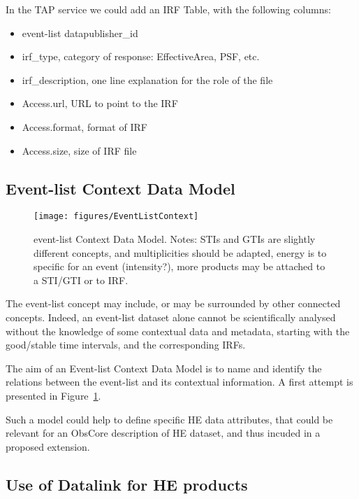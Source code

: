 \documentclass[11pt,a4paper]{ivoa}
\begin{document}
{In the \gls{TAP} service we could add an \gls{IRF} Table, with the following columns:

\begin{itemize}
    \item event-list datapublisher\_id
    \item irf\_type, category of response: EffectiveArea, \gls{PSF}, etc.
    \item irf\_description, one line explanation for the role of the file
    \item Access.url, URL to point to the \gls{IRF}
    \item Access.format, format of \gls{IRF}
    \item Access.size, size of \gls{IRF} file
\end{itemize}



\subsection{Event-list Context Data Model}
\label{sec:EventListContext}

\begin{figure}
\centering
\texttt{[image: figures/EventListContext]}
\caption{event-list Context Data Model. Notes: \gls{STI}s and \gls{GTI}s are slightly different concepts, and multiplicities should be adapted, energy is to specific for an event (intensity?), more products may be attached to a \gls{STI}/\gls{GTI} or to \gls{IRF}.}
\label{fig:EventListContext}
\end{figure}

The event-list concept may include, or may be surrounded by other connected concepts. Indeed, an event-list dataset alone cannot be scientifically analysed without the knowledge of some contextual data and metadata, starting with the good/stable time intervals, and the corresponding \gls{IRF}s.

The aim of an Event-list Context Data Model is to name and identify the relations between the event-list and its contextual information. A first attempt is presented in Figure~\ref{fig:EventListContext}.

Such a model could help to define specific \gls{HE} data attributes, that could be relevant for an ObsCore description of \gls{HE} dataset, and thus incuded in a proposed extension.


\subsection{Use of Datalink for HE products}
\label{sec:datalink}

}
\end{document}

